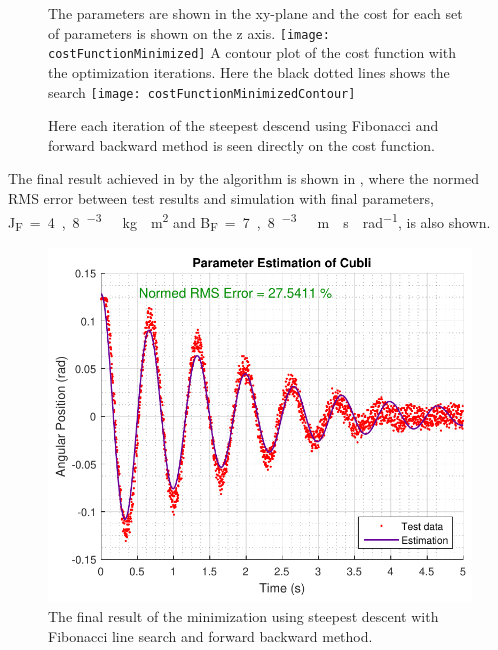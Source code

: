 \begin{figure}[H]
  \begin{minipage}{\linewidth}
    \captionsetup[subfigure]{font = footnotesize}
    \centering
    \subcaptionbox
    {
      The parameters are shown in the xy-plane and the cost for each set of parameters is shown on the z axis.
      \label{CostFunctionMinimized3D}
    }
    {
      \texttt{[image: costFunctionMinimized]}
    }\quad
    \subcaptionbox
    {
      A contour plot of the cost function with the optimization iterations. Here the black dotted lines shows the search 
      \label{CostFunctionMinimizedContour}
    }
    {
      \texttt{[image: costFunctionMinimizedContour]}
    }
    \caption{Here each iteration of the steepest descend using Fibonacci and forward backward method is seen directly on the cost function.}
    \label{CostFunctionMinimized}
  \end{minipage}
\end{figure}

The final result achieved in by the algorithm is shown in , where the normed RMS error between test results and simulation with final parameters, \si{J_F=4,8 ^{-3}\ kg \cdot m^2} and \si{B_F=7,8 ^{-3}\ m \cdot s \cdot rad^{-1}}, is also shown.

\begin{figure}[H] 
	\centering
	\includegraphics[width=.8\textwidth]{figures/resultOfGradientWithFibonacciAndForwardBackward}
	\caption{The final result of the minimization using steepest descent with Fibonacci line search and forward backward method.}
	\label{resultOfGradientWithFibonacciAndForwardBackward}
\end{figure}